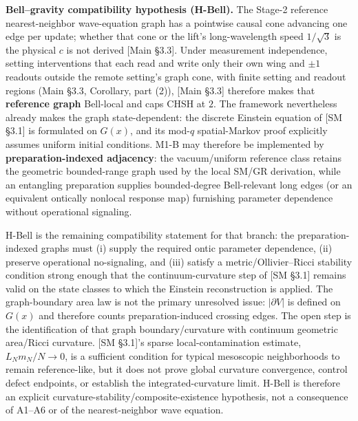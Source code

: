 \documentclass[
]{article}
\begin{document}
\textbf{Bell--gravity compatibility hypothesis (H-Bell).} The Stage-2
reference nearest-neighbor wave-equation graph has a pointwise causal
cone advancing one edge per update; whether that cone or the lift's
long-wavelength speed \(1/\sqrt3\) is the physical \(c\) is not derived
{[}Main §3.3{]}. Under measurement independence, setting interventions
that each read and write only their own wing and \(\pm1\) readouts
outside the remote setting's graph cone, with finite setting and readout
regions (Main §3.3, Corollary, part (2)), {[}Main §3.3{]} therefore
makes that \textbf{reference graph} Bell-local and caps CHSH at \(2\).
The framework nevertheless already makes the graph state-dependent: the
discrete Einstein equation of {[}SM §3.1{]} is formulated on \(G(x)\),
and its mod-\(q\) spatial-Markov proof explicitly assumes uniform
initial conditions. M1-B may therefore be implemented by
\textbf{preparation-indexed adjacency}: the vacuum/uniform reference
class retains the geometric bounded-range graph used by the local SM/GR
derivation, while an entangling preparation supplies bounded-degree
Bell-relevant long edges (or an equivalent ontically nonlocal response
map) furnishing parameter dependence without operational signaling.

H-Bell is the remaining compatibility statement for that branch: the
preparation-indexed graphs must (i) supply the required ontic parameter
dependence, (ii) preserve operational no-signaling, and (iii) satisfy a
metric/Ollivier--Ricci stability condition strong enough that the
continuum-curvature step of {[}SM §3.1{]} remains valid on the state
classes to which the Einstein reconstruction is applied. The
graph-boundary area law is not the primary unresolved issue:
\(|\partial V|\) is defined on \(G(x)\) and therefore counts
preparation-induced crossing edges. The open step is the identification
of that graph boundary/curvature with continuum geometric area/Ricci
curvature. {[}SM §3.1{]}'s sparse local-contamination estimate,
\(L_Nm_N/N\to0\), is a sufficient condition for typical mesoscopic
neighborhoods to remain reference-like, but it does not prove global
curvature convergence, control defect endpoints, or establish the
integrated-curvature limit. H-Bell is therefore an explicit
curvature-stability/composite-existence hypothesis, not a consequence of
A1--A6 or of the nearest-neighbor wave equation.
\end{document}
